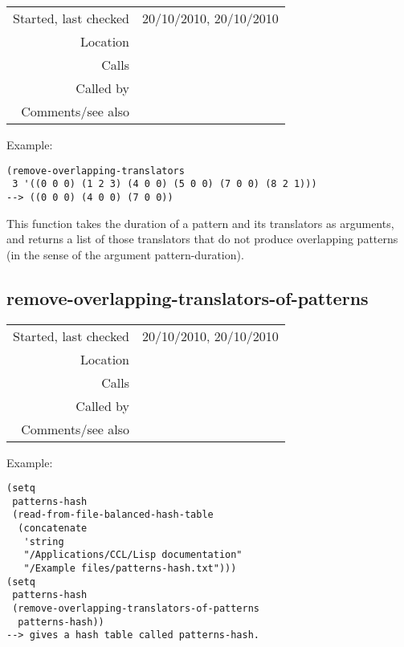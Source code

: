 \vspace{0.3cm}
\begin{tabular}{r|p{8cm}}
Started, last checked & 20/10/2010, 20/10/2010 \\
Location & \nameref{sec:pattern-inheritance-preliminaries} \\
Calls & \\
Called by & \nameref{fun:remove-overlapping-translators-of-patterns} \\
Comments/see also & 
\end{tabular}

\vspace{0.5cm}
\noindent Example:
\begin{verbatim}
(remove-overlapping-translators
 3 '((0 0 0) (1 2 3) (4 0 0) (5 0 0) (7 0 0) (8 2 1)))
--> ((0 0 0) (4 0 0) (7 0 0))
\end{verbatim}

\noindent This function takes the duration of a
pattern and its translators as arguments, and returns
a list of those translators that do not produce
overlapping patterns (in the sense of the argument
pattern-duration).


\subsection*{remove-overlapping-translators-of-patterns}\label{fun:remove-overlapping-translators-of-patterns}

\vspace{0.3cm}
\begin{tabular}{r|p{8cm}}
Started, last checked & 20/10/2010, 20/10/2010 \\
Location & \nameref{sec:pattern-inheritance-preliminaries} \\
Calls & \nameref{fun:remove-overlapping-translators} \\
Called by & \nameref{fun:prepare-for-pattern-inheritance} \\
Comments/see also & 
\end{tabular}

\vspace{0.5cm}
\noindent Example:
\begin{verbatim}
(setq
 patterns-hash
 (read-from-file-balanced-hash-table
  (concatenate
   'string
   "/Applications/CCL/Lisp documentation"
   "/Example files/patterns-hash.txt")))
(setq
 patterns-hash
 (remove-overlapping-translators-of-patterns
  patterns-hash))
--> gives a hash table called patterns-hash.
\end{verbatim}

